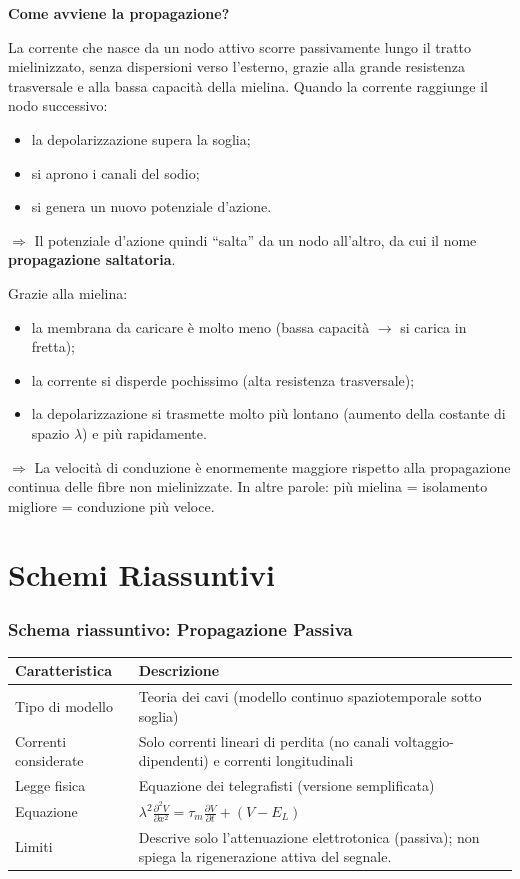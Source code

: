 \documentclass[12pt,a4paper,openany]{book}
\begin{document}
\textbf{Come avviene la propagazione?}

La corrente che nasce da un nodo attivo scorre passivamente lungo il tratto mielinizzato, senza dispersioni verso l’esterno, grazie alla grande resistenza trasversale e alla bassa capacità della mielina.
Quando la corrente raggiunge il nodo successivo:
\begin{itemize}
  \item la depolarizzazione supera la soglia;
  \item si aprono i canali del sodio;
  \item si genera un nuovo potenziale d’azione.
\end{itemize}
$\Rightarrow$ Il potenziale d’azione quindi “salta” da un nodo all’altro, da cui il nome \textbf{propagazione saltatoria}.

Grazie alla mielina:
\begin{itemize}
  \item la membrana da caricare è molto meno (bassa capacità $\rightarrow$ si carica in fretta);
  \item la corrente si disperde pochissimo (alta resistenza trasversale);
  \item la depolarizzazione si trasmette molto più lontano (aumento della costante di spazio $\lambda$) e più rapidamente.
\end{itemize}
$\Rightarrow$ La velocità di conduzione è enormemente maggiore rispetto alla propagazione continua delle fibre non mielinizzate. In altre parole: più mielina = isolamento migliore = conduzione più veloce.

\clearpage
\section{Schemi Riassuntivi}

\subsubsection{Schema riassuntivo: Propagazione Passiva}
\begin{table}[H]
\centering
\renewcommand{\arraystretch}{1.5}
\begin{tabularx}{\textwidth}{l X}
\toprule
\textbf{Caratteristica} & \textbf{Descrizione} \\
\midrule
Tipo di modello & Teoria dei cavi (modello continuo spaziotemporale sotto soglia) \\
Correnti considerate & Solo correnti lineari di perdita (no canali voltaggio-dipendenti) e correnti longitudinali \\
Legge fisica & Equazione dei telegrafisti (versione semplificata) \\
Equazione & $\displaystyle \lambda^2 \frac{\partial^2 V}{\partial x^2} = \tau_m \frac{\partial V}{\partial t} + (V - E_L)$ \\
Limiti & Descrive solo l’attenuazione elettrotonica (passiva); non spiega la rigenerazione attiva del segnale. \\
\bottomrule
\end{tabularx}
\end{table}
\end{document}
